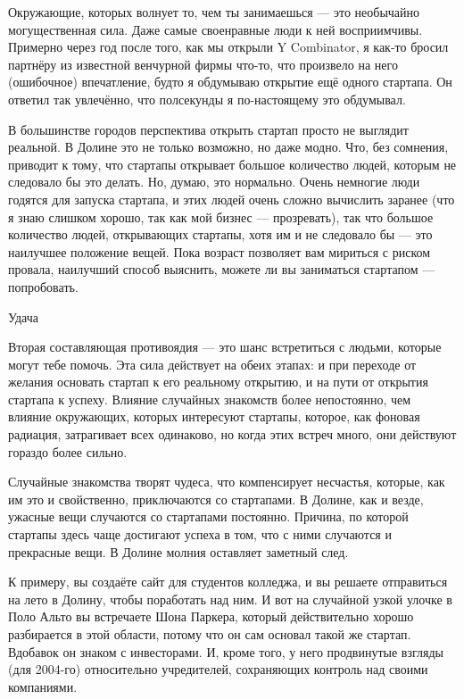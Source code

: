 \documentclass[ebook,12pt,oneside,openany]{memoir}
\begin{document}
Окружающие, которых волнует то, чем ты занимаешься — это необычайно
могущественная сила. Даже самые своенравные люди к ней восприимчивы.
Примерно через год после того, как мы открыли Y Combinator, я как-то
бросил партнёру из известной венчурной фирмы что-то, что произвело на
него (ошибочное) впечатление, будто я обдумываю открытие ещё одного
стартапа. Он ответил так увлечённо, что полсекунды я по-настоящему это
обдумывал.

В большинстве городов перспектива открыть стартап просто не выглядит
реальной. В Долине это не только возможно, но даже модно. Что, без
сомнения, приводит к тому, что стартапы открывает большое количество
людей, которым не следовало бы это делать. Но, думаю, это нормально.
Очень немногие люди годятся для запуска стартапа, и этих людей очень
сложно вычислить заранее (что я знаю слишком хорошо, так как мой
бизнес — прозревать), так что большое количество людей, открывающих
стартапы, хотя им и не следовало бы — это наилучшее положение вещей.
Пока возраст позволяет вам мириться с риском провала, наилучший способ
выяснить, можете ли вы заниматься стартапом — попробовать.

Удача

Вторая составляющая противоядия — это шанс встретиться с людьми,
которые могут тебе помочь. Эта сила действует на обеих этапах: и при
переходе от желания основать стартап к его реальному открытию, и на
пути от открытия стартапа к успеху. Влияние случайных знакомств более
непостоянно, чем влияние окружающих, которых интересуют стартапы,
которое, как фоновая радиация, затрагивает всех одинаково, но когда
этих встреч много, они действуют гораздо более сильно.

Случайные знакомства творят чудеса, что компенсирует несчастья,
которые, как им это и свойственно, приключаются со стартапами. В
Долине, как и везде, ужасные вещи случаются со стартапами постоянно.
Причина, по которой стартапы здесь чаще достигают успеха в том, что с
ними случаются и прекрасные вещи. В Долине молния оставляет заметный
след.

К примеру, вы создаёте сайт для студентов колледжа, и вы решаете
отправиться на лето в Долину, чтобы поработать над ним. И вот на
случайной узкой улочке в Поло Альто вы встречаете Шона Паркера,
который действительно хорошо разбирается в этой области, потому что он
сам основал такой же стартап. Вдобавок он знаком с инвесторами. И,
кроме того, у него продвинутые взгляды (для 2004-го) относительно
учредителей, сохраняющих контроль над своими компаниями.
\end{document}
